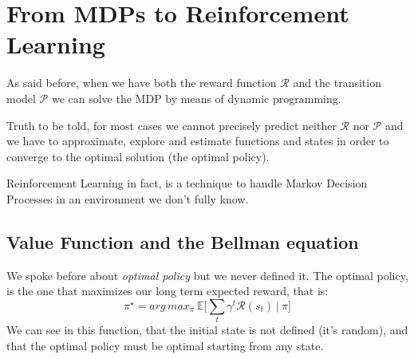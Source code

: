 \chapter{From MDPs to Reinforcement Learning}
\label{chapter3}

\vspace{0.5cm}

\noindent As said before, when we have both the reward function $\mathcal{R}$ and the transition model $\mathcal{P}$ we can solve the MDP by means of dynamic programming.

Truth to be told, for most cases we cannot precisely predict neither $\mathcal{R}$ nor $\mathcal{P}$ and we have to approximate, explore and estimate functions and states in order to converge to the optimal solution (the optimal policy).

Reinforcement Learning in fact, is a technique to handle Markov Decision Processes in an environment we don't fully know.

\section{Value Function and the Bellman equation}
We spoke before about \textit{optimal policy} but we never defined it. The optimal policy, is the one that maximizes our long term expected reward, that is:
\begin{equation}
    \pi^\star = arg\,max_\pi \ \mathbb{E} \Big[ \sum_t \gamma^t \mathcal{R}(s_t) \ \vert \ \pi \Big]
\end{equation}
\noindent
We can see in this function, that the initial state is not defined (it's random), and that the optimal policy must be optimal starting from any state.

